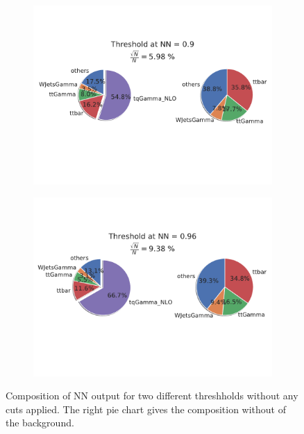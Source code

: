 \begin{figure}
    \centering
    \begin{subfigure}[b]{0.6\textwidth}
       \includegraphics[width=1\linewidth]{Plots/composition9FULL.pdf}
    \end{subfigure}
    
    \begin{subfigure}[b]{0.6\textwidth}
       \includegraphics[width=1\linewidth]{Plots/compositionTenFULL.pdf}
    \end{subfigure}
    \caption{Composition of NN output for two different threshholds without any cuts applied. The right pie chart gives the composition without of the background.}
    \label{fig:full}
\end{figure}



